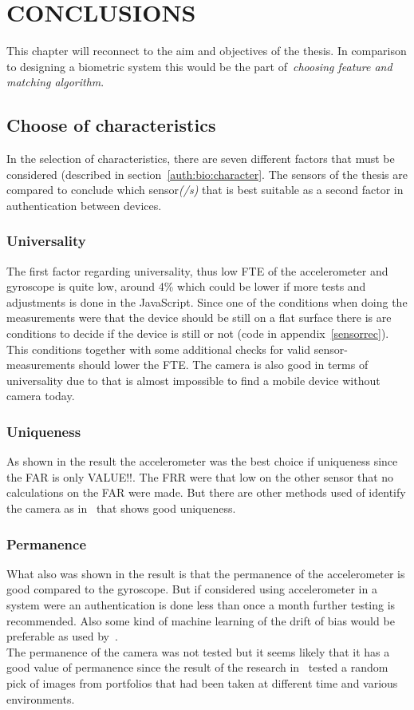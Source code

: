 \chapter{CONCLUSIONS}\label{cha:conculsions}
This chapter will reconnect to the aim and objectives of the thesis. In comparison to designing a biometric system this would be the part of~\textit{choosing feature and matching algorithm}.

\section{Choose of characteristics}\label{sec:concl:choose}
In the selection of characteristics, there are seven different factors that must be considered (described in section~\ref{auth:bio:character}. The sensors of the thesis are compared to conclude which sensor\textit{(/s)} that is best suitable as a second factor in authentication between devices.

\subsection*{Universality}
The first factor regarding universality, thus low FTE of the accelerometer and gyroscope is quite low, around 4\% which could be lower if more tests and adjustments is done in the JavaScript. Since one of the conditions when doing the measurements were that the device should be still on a flat surface there is are conditions to decide if the device is still or not (code in appendix~\ref{sensorrec}). This conditions together with some additional checks for valid sensor-measurements should lower the FTE.  The camera is also good in terms of universality due to that is almost impossible to find a mobile device without camera today.\\

\subsection*{Uniqueness}
As shown in the result the accelerometer was the best choice if uniqueness since the FAR is only VALUE!!. The FRR were that low on the other sensor that no calculations on the FAR were made. But there are other methods used of identify the camera as in~\cite{sensor:camera:blind} that shows good uniqueness.

\subsection*{Permanence}
What also was shown in the result is that the permanence of the accelerometer is good compared to the gyroscope. But if considered using accelerometer in a system were an authentication is done less than once a month further testing is recommended. Also some kind of machine learning of the drift of bias would be preferable as used by~\cite{sensor:accelPrint}. \\
The permanence of the camera was not tested but it seems likely that it has a good value of permanence since the result of the research in~\cite{sensor:camera:DCIdent} tested a random pick of images from portfolios that had been taken at different time and various environments. 

